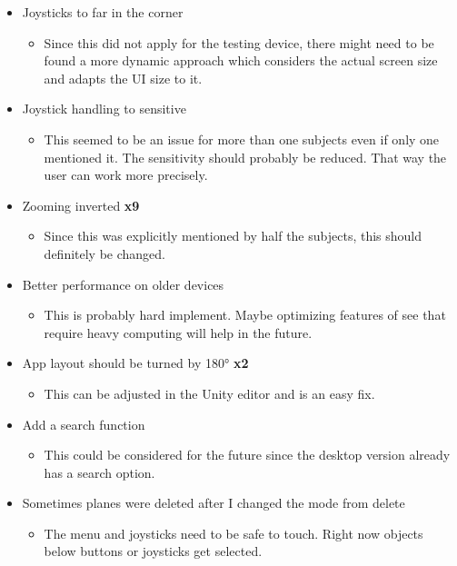\begin{itemize}
\begin{itemize}
  \end{itemize}
  \item Joysticks to far in the corner
  \begin{itemize}
    \item Since this did not apply for the testing device, there might need to be found a more dynamic approach which considers the actual screen size and adapts the UI size to it. 
  \end{itemize}
  \item Joystick handling to sensitive 
  \begin{itemize}
    \item This seemed to be an issue for more than one subjects even if only one mentioned it. The sensitivity should probably be reduced. That way the user can work more precisely.
  \end{itemize}
  \item Zooming inverted \textbf{x9}
  \begin{itemize}
    \item Since this was explicitly mentioned by half the subjects, this should definitely be changed. 
  \end{itemize}
  \item Better performance on older devices
  \begin{itemize}
    \item This is probably hard implement. Maybe optimizing features of \gls{see} that require heavy computing will help in the future.
  \end{itemize}
  \item App layout should be turned by 180° \textbf{x2}
  \begin{itemize}
    \item This can be adjusted in the Unity editor and is an easy fix. 
  \end{itemize}
  \item Add a search function
  \begin{itemize}
    \item This could be considered for the future since the desktop version already has a search option.
  \end{itemize}
  \item Sometimes planes were deleted after I changed the mode from delete
  \begin{itemize}
    \item The menu and joysticks need to be safe to touch. Right now objects below buttons or joysticks get selected.
  \end{itemize}
\end{itemize} 

